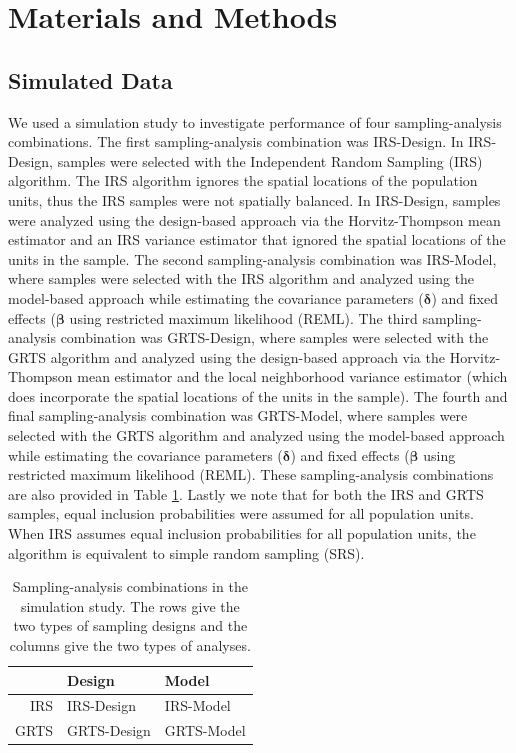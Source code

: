 \documentclass[]{elsarticle} %
\begin{document}
\hypertarget{sec:mm}{%
\section{Materials and Methods}\label{sec:mm}}

\hypertarget{sec:mm_sim}{%
\subsection{Simulated Data}\label{sec:mm_sim}}

We used a simulation study to investigate performance of four
sampling-analysis combinations. The first sampling-analysis combination
was IRS-Design. In IRS-Design, samples were selected with the
Independent Random Sampling (IRS) algorithm. The IRS algorithm ignores
the spatial locations of the population units, thus the IRS samples were
not spatially balanced. In IRS-Design, samples were analyzed using the
design-based approach via the Horvitz-Thompson mean estimator and an IRS
variance estimator that ignored the spatial locations of the units in
the sample. The second sampling-analysis combination was IRS-Model,
where samples were selected with the IRS algorithm and analyzed using
the model-based approach while estimating the covariance parameters
(\(\bm{\delta}\)) and fixed effects (\(\bm{\beta}\) using restricted
maximum likelihood (REML). The third sampling-analysis combination was
GRTS-Design, where samples were selected with the GRTS algorithm and
analyzed using the design-based approach via the Horvitz-Thompson mean
estimator and the local neighborhood variance estimator (which does
incorporate the spatial locations of the units in the sample). The
fourth and final sampling-analysis combination was GRTS-Model, where
samples were selected with the GRTS algorithm and analyzed using the
model-based approach while estimating the covariance parameters
(\(\bm{\delta}\)) and fixed effects (\(\bm{\beta}\) using restricted
maximum likelihood (REML). These sampling-analysis combinations are also
provided in Table \ref{tab:designanalysis}. Lastly we note that for both
the IRS and GRTS samples, equal inclusion probabilities were assumed for
all population units. When IRS assumes equal inclusion probabilities for
all population units, the algorithm is equivalent to simple random
sampling (SRS).

\begin{table}[ht]
\centering
\begin{tabular}{r|ll}
  \hline
 & Design & Model \\ 
  \hline
IRS & IRS-Design & IRS-Model \\ 
  GRTS & GRTS-Design & GRTS-Model \\ 
   \hline
\end{tabular}
\caption{\label{tab:designanalysis} Sampling-analysis combinations in the simulation study. The rows give the two types of sampling designs and the columns give the two types of analyses.} 
\end{table}
\end{document}
